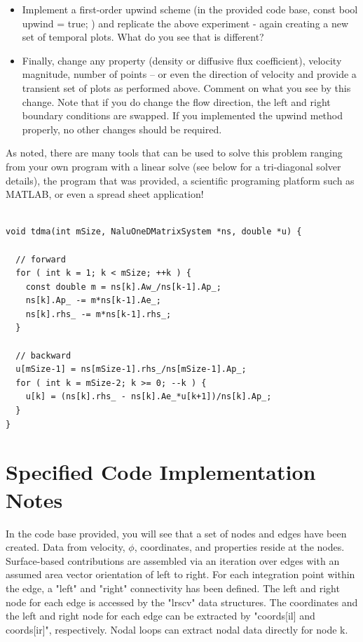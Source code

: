 \documentclass{article}
\begin{document}
\begin{itemize}
\item Implement a first-order upwind scheme (in the provided code base, const bool upwind = true; ) and replicate the
  above experiment - again creating a new set of temporal plots. What do you see that is different?

\item Finally, change any property (density or diffusive flux coefficient), velocity magnitude, number of points --
  or even the direction of velocity and provide a transient set of plots as performed above. Comment on what you
  see by this change. Note that if you do change the flow direction, the left and right boundary conditions are swapped. If you implemented the upwind method properly, no other changes should be required.

\end{itemize}

As noted, there are many tools that can be used to solve this problem ranging from your own program with a linear
solve (see below for a tri-diagonal solver details), the program that was provided, a scientific programing platform
such as MATLAB, or even a spread sheet application!

\newpage

\begin{lstlisting}[caption={This is a tri-diagonal implicit matrix solve routine (also
known as the Thomas Algorithm) and is suitable for solving a diagonal dominant matrix system. For structured
three-dimensional applications, alternating sweep directions can be combined with the tri-diagonal solve. In this 
implementation, the matrix coefficients are modified and are not intended to be re-used for each subsequent 
iteration.},captionpos=b]

void tdma(int mSize, NaluOneDMatrixSystem *ns, double *u) {
  
  // forward
  for ( int k = 1; k < mSize; ++k ) {
    const double m = ns[k].Aw_/ns[k-1].Ap_;
    ns[k].Ap_ -= m*ns[k-1].Ae_;
    ns[k].rhs_ -= m*ns[k-1].rhs_;
  }

  // backward
  u[mSize-1] = ns[mSize-1].rhs_/ns[mSize-1].Ap_;
  for ( int k = mSize-2; k >= 0; --k ) {
    u[k] = (ns[k].rhs_ - ns[k].Ae_*u[k+1])/ns[k].Ap_;
  }
}

\end{lstlisting}

\section{Specified Code Implementation Notes}
In the code base provided, you will see that a set of nodes and edges have been created. Data from velocity, $\phi$, coordinates, and properties reside at the nodes. Surface-based contributions are assembled via an iteration over edges with an assumed area vector orientation of left to right. For each integration point within the edge, a "left" and "right" connectivity has been defined. The left and right node for each edge is accessed by the "lrscv" data structures. The coordinates and the left and right node for each edge can be extracted by "coords[il] and coords[ir]", respectively. Nodal loops can extract nodal data directly for node k. 
\end{document}
